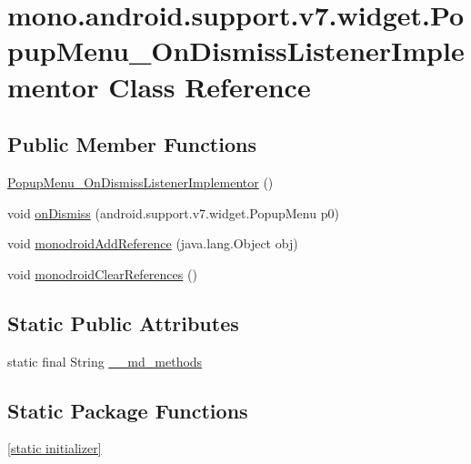 \hypertarget{classmono_1_1android_1_1support_1_1v7_1_1widget_1_1_popup_menu___on_dismiss_listener_implementor}{
\section{mono.android.support.v7.widget.PopupMenu\_\-OnDismissListenerImplementor Class Reference}
\label{classmono_1_1android_1_1support_1_1v7_1_1widget_1_1_popup_menu___on_dismiss_listener_implementor}
}
\subsection*{Public Member Functions}
\begin{CompactItemize}
\item 
\hyperlink{classmono_1_1android_1_1support_1_1v7_1_1widget_1_1_popup_menu___on_dismiss_listener_implementor_7f600ddc8c698038757a0b9837916ded}{PopupMenu\_\-OnDismissListenerImplementor} ()
\item 
void \hyperlink{classmono_1_1android_1_1support_1_1v7_1_1widget_1_1_popup_menu___on_dismiss_listener_implementor_474799f83aa29d01bffdb0ba7f644163}{onDismiss} (android.support.v7.widget.PopupMenu p0)
\item 
void \hyperlink{classmono_1_1android_1_1support_1_1v7_1_1widget_1_1_popup_menu___on_dismiss_listener_implementor_fc755fd6a7af3fa62ab68a4c2c9f4d4c}{monodroidAddReference} (java.lang.Object obj)
\item 
void \hyperlink{classmono_1_1android_1_1support_1_1v7_1_1widget_1_1_popup_menu___on_dismiss_listener_implementor_c7bbc2cdc32f800fc1ebb9767a75b29a}{monodroidClearReferences} ()
\end{CompactItemize}
\subsection*{Static Public Attributes}
\begin{CompactItemize}
\item 
static final String \hyperlink{classmono_1_1android_1_1support_1_1v7_1_1widget_1_1_popup_menu___on_dismiss_listener_implementor_cfbe85e634b5066ac1cdc76d4d5a81c5}{\_\-\_\-md\_\-methods}
\end{CompactItemize}
\subsection*{Static Package Functions}
\begin{CompactItemize}
\item 
\hyperlink{classmono_1_1android_1_1support_1_1v7_1_1widget_1_1_popup_menu___on_dismiss_listener_implementor_fc6342721c381ae87c8f8fd66a335148}{\mbox{[}static initializer\mbox{]}}
\end{CompactItemize}
